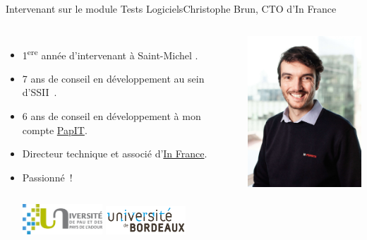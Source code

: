 \documentclass{beamer}
\begin{document}
    \begin{frame}{Intervenant sur le module Tests Logiciels}{Christophe Brun, CTO d'In France}

        \begin{columns}
            \begin{itemize}
                \item 1\textsuperscript{ere} année d’intervenant à Saint-Michel .

                \item 7 ans de conseil en développement au sein d’SSII~.

                \item 6 ans de conseil en développement à mon compte \href{https://papit.fr}{PapIT}.

                \item Directeur technique et associé d’\href{https://in-france.fr}{In France}.

                \item Passionné~!
                \bigbreak
                \begin{columns}
                    \centering
                    \includegraphics[width=3cm]{image/logo-uppa}
                    \centering
                    \includegraphics[width=3cm]{image/logo-universite-bordeaux}
                \end{columns}
            \end{itemize}
            \centering
            \includegraphics[width=5cm]{image/trombine-christophe}
        \end{columns}
    \end{frame}
\end{document}
